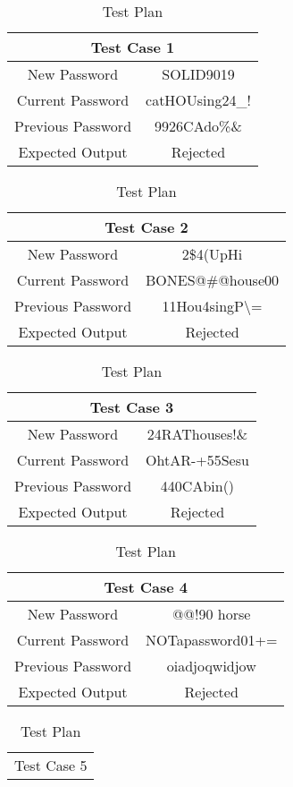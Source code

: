 \documentclass[12pt,letterpaper]{article}
\begin{document}
\begin{table}[h]
  \caption{Test Plan}
  \label{tab:Test Plan}
\begin{centering}
  \begin{tabular}{||c|c||}
  \hline
  \multicolumn{2}{||c||}{Test Case 1} \\
  \hline
  New Password & SOLID9019 \\
  \hline
  Current Password & catHOUsing24\_! \\
  \hline
  Previous Password & 9926CAdo\%\& \\
  \hline
  Expected Output & Rejected \\
  \hline
  \end{tabular}
  \begin{tabular}{||c|c||}
  \hline
  \multicolumn{2}{||c||}{Test Case 2} \\
  \hline
  New Password & 2\$4(UpHi \\
  \hline
  Current Password & BONES@\#@house00 \\
  \hline
  Previous Password & 11Hou4singP\textbackslash= \\
  \hline
  Expected Output & Rejected \\
  \hline
  \end{tabular}
  \begin{tabular}{||c|c||}
  \hline
  \multicolumn{2}{||c||}{Test Case 3} \\
  \hline
  New Password & 24RAThouses!\& \\
  \hline
  Current Password & OhtAR-+55Sesu \\
  \hline
  Previous Password & 440CAbin() \\
  \hline
  Expected Output & Rejected \\
  \hline
  \end{tabular}
  \begin{tabular}{||c|c||}
  \hline
  \multicolumn{2}{||c||}{Test Case 4} \\
  \hline
  New Password & @@!90 horse \\
  \hline
  Current Password & NOTapassword01+= \\
  \hline
  Previous Password & oiadjoqwidjow \\
  \hline
  Expected Output & Rejected \\
  \hline
  \end{tabular}
  \begin{tabular}{||c|c||}
  \hline
  \multicolumn{2}{||c||}{Test Case 5} \\

\end{tabular}
\end{centering}
\end{table}
\end{document}
